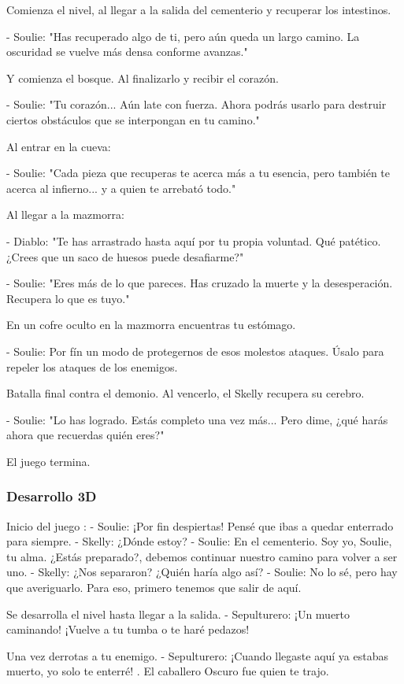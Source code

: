 \documentclass[12pt,a4paper,twoside,spanish]{article}      %
\begin{document}
Comienza el nivel, al llegar a la salida del cementerio y recuperar los intestinos.


- Soulie: "Has recuperado algo de ti, pero aún queda un largo camino. La oscuridad se vuelve más densa conforme avanzas."

Y comienza el bosque. Al finalizarlo y recibir el corazón.

- Soulie: "Tu corazón... Aún late con fuerza. Ahora podrás usarlo para destruir ciertos obstáculos que se interpongan en tu camino."

Al entrar en la cueva:

- Soulie: "Cada pieza que recuperas te acerca más a tu esencia, pero también te acerca al infierno... y a quien te arrebató todo."

Al llegar a la mazmorra:

- Diablo: "Te has arrastrado hasta aquí por tu propia voluntad. Qué patético. ¿Crees que un saco de huesos puede desafiarme?"

- Soulie: "Eres más de lo que pareces. Has cruzado la muerte y la desesperación. Recupera lo que es tuyo."

En un cofre oculto en la mazmorra encuentras tu estómago.

- Soulie: Por fín un modo de protegernos de esos molestos ataques. Úsalo para repeler los ataques de los enemigos.

Batalla final contra el demonio. Al vencerlo, el Skelly recupera su cerebro.

- Soulie: "Lo has logrado. Estás completo una vez más... Pero dime, ¿qué harás ahora que recuerdas quién eres?"

El juego termina.


\subsubsection{Desarrollo 3D}
Inicio del juego : 
- Soulie:  ¡Por fin despiertas! Pensé que ibas a quedar enterrado para siempre.
- Skelly:  ¿Dónde estoy?
- Soulie: En el cementerio. Soy yo,  Soulie, tu alma. ¿Estás preparado?, debemos continuar nuestro camino para volver a ser uno.
- Skelly:  ¿Nos separaron? ¿Quién haría algo así?
- Soulie: No lo sé, pero hay que averiguarlo. Para eso, primero tenemos que salir de aquí.


Se desarrolla el nivel hasta llegar a la salida. 
- Sepulturero:  ¡Un muerto caminando! ¡Vuelve a tu tumba o te haré pedazos!

Una vez derrotas a tu enemigo.
- Sepulturero: ¡Cuando llegaste aquí ya estabas muerto, yo solo te enterré! . El caballero Oscuro fue quien te trajo.
\end{document}
